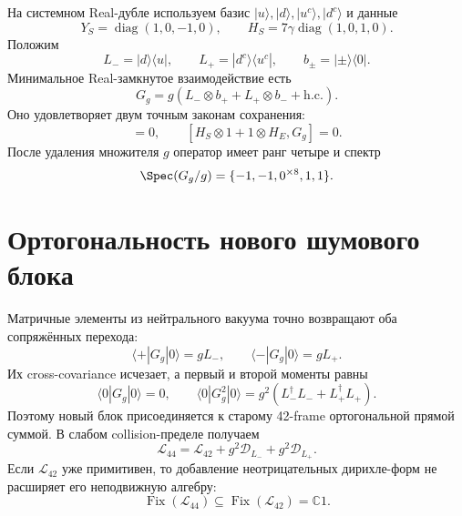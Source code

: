На системном Real-дубле используем базис
$|u\rangle,|d\rangle,|u^c\rangle,|d^c\rangle$ и данные
\begin{equation}
 Y_S=\operatorname{diag}(1,0,-1,0),
 \qquad H_S=7\gamma\operatorname{diag}(1,0,1,0).
 \label{eq:v8-mediator-dynamic-system-data}
\end{equation}
Положим
\begin{equation}
 L_-=|d\rangle\langle u|,
 \qquad L_+=|d^c\rangle\langle u^c|,
 \qquad b_\pm=|\pm\rangle\langle0|.
 \label{eq:v8-mediator-dynamic-jumps}
\end{equation}
Минимальное Real-замкнутое взаимодействие есть
\begin{equation}
 G_g=g\left(L_-\otimes b_++L_+\otimes b_-+\mathrm{h.c.}\right).
 \label{eq:v8-mediator-dynamic-interaction}
\end{equation}
Оно удовлетворяет двум точным законам сохранения:
\begin{equation}
 [Y_S\otimes1+1\otimes Y_E,G_g]=0,
 \qquad [H_S\otimes1+1\otimes H_E,G_g]=0.
 \label{eq:v8-mediator-dynamic-conservation}
\end{equation}
После удаления множителя $g$ оператор имеет ранг четыре и спектр
\begin{equation}
 \Spec(G_g/g)=\{-1,-1,0^{\times8},1,1\}.
 \label{eq:v8-mediator-dynamic-spectrum}
\end{equation}

\section{Ортогональность нового шумового блока}

Матричные элементы из нейтрального вакуума точно возвращают оба
сопряжённых перехода:
\begin{equation}
 \langle+|G_g|0\rangle=gL_-,
 \qquad \langle-|G_g|0\rangle=gL_+.
 \label{eq:v8-mediator-dynamic-extraction}
\end{equation}
Их cross-covariance исчезает, а первый и второй моменты равны
\begin{equation}
 \langle0|G_g|0\rangle=0,
 \qquad
 \langle0|G_g^2|0\rangle
 =g^2(L_-^\dagger L_-+L_+^\dagger L_+).
 \label{eq:v8-mediator-dynamic-moments}
\end{equation}
Поэтому новый блок присоединяется к старому 42-frame ортогональной прямой
суммой. В слабом collision-пределе получаем
\begin{equation}
 \mathcal L_{44}=\mathcal L_{42}
 +g^2\mathcal D_{L_-}+g^2\mathcal D_{L_+}.
 \label{eq:v8-mediator-dynamic-generator}
\end{equation}
Если $\mathcal L_{42}$ уже примитивен, то добавление неотрицательных
дирихле-форм не расширяет его неподвижную алгебру:
\begin{equation}
 \operatorname{Fix}(\mathcal L_{44})
 \subseteq\operatorname{Fix}(\mathcal L_{42})=\mathbb C1.
 \label{eq:v8-mediator-dynamic-fixed-algebra}
\end{equation}

